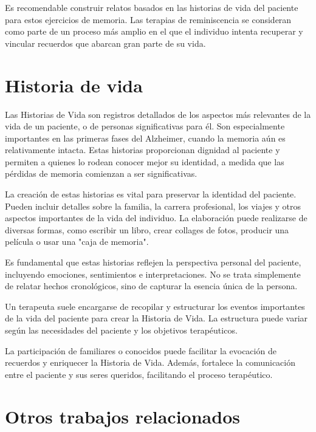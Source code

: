 Es recomendable construir relatos basados en las historias de vida del paciente para estos ejercicios de memoria. Las terapias de reminiscencia se consideran como parte de un proceso más amplio en el que el individuo intenta recuperar y vincular recuerdos que abarcan gran parte de su vida.
\section{Historia de vida}
Las Historias de Vida son registros detallados de los aspectos más relevantes de la vida de un paciente, o de personas significativas para él. Son especialmente importantes en las primeras fases del Alzheimer, cuando la memoria aún es relativamente intacta. Estas historias proporcionan dignidad al paciente y permiten a quienes lo rodean conocer mejor su identidad, a medida que las pérdidas de memoria comienzan a ser significativas.

La creación de estas historias es vital para preservar la identidad del paciente. Pueden incluir detalles sobre la familia, la carrera profesional, los viajes y otros aspectos importantes de la vida del individuo. La elaboración puede realizarse de diversas formas, como escribir un libro, crear collages de fotos, producir una película o usar una "caja de memoria".

Es fundamental que estas historias reflejen la perspectiva personal del paciente, incluyendo emociones, sentimientos e interpretaciones. No se trata simplemente de relatar hechos cronológicos, sino de capturar la esencia única de la persona.

Un terapeuta suele encargarse de recopilar y estructurar los eventos importantes de la vida del paciente para crear la Historia de Vida. La estructura puede variar según las necesidades del paciente y los objetivos terapéuticos.

La participación de familiares o conocidos puede facilitar la evocación de recuerdos y enriquecer la Historia de Vida. Además, fortalece la comunicación entre el paciente y sus seres queridos, facilitando el proceso terapéutico.
\section{Otros trabajos relacionados}
